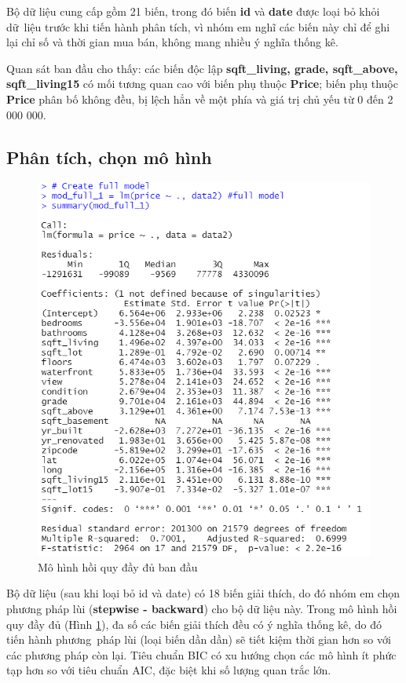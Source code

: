 Bộ dữ liệu cung cấp gồm 21 biến, trong đó biến \textbf{id} và \textbf{date} được loại bỏ khỏi dữ~liệu trước khi tiến hành phân tích, vì nhóm em nghĩ các biến này chỉ để ghi lại chỉ số và thời gian mua bán, không mang nhiều ý nghĩa thống kê. 

Quan sát ban đầu cho thấy: các biến độc lập \textbf{sqft\_living, grade, sqft\_above, sqft\_living15} có mối tương quan cao với biến phụ thuộc \textbf{Price}; biến phụ thuộc \textbf{Price} phân bố không đều, bị lệch hẳn về một phía và giá trị chủ yếu từ 0 đến 2 000 000.
\subsection*{Phân tích, chọn mô hình}

\begin{figure}[H]
	\centering
	\includegraphics[width=.7\linewidth]{../Photo Of Result/B2_originalmodel_R}
	\caption{Mô hình hồi quy đầy đủ ban đầu}
	\label{B2_full}
\end{figure}

Bộ dữ liệu (sau khi loại bỏ id và date) có 18 biến giải thích, do đó nhóm em chọn phương pháp lùi (\textbf{stepwise - backward}) cho bộ dữ liệu này. Trong mô hình hồi quy đầy đủ (Hình \ref{B2_full}), đa số các biến giải thích đều có ý nghĩa thống kê, do đó tiến hành phương~pháp lùi (loại biến dần dần) sẽ tiết kiệm thời gian hơn so với các phương pháp còn lại.  Tiêu chuẩn BIC có xu hướng chọn các mô hình ít phức tạp hơn so với tiêu chuẩn AIC, đặc biệt khi số lượng quan trắc lớn.

